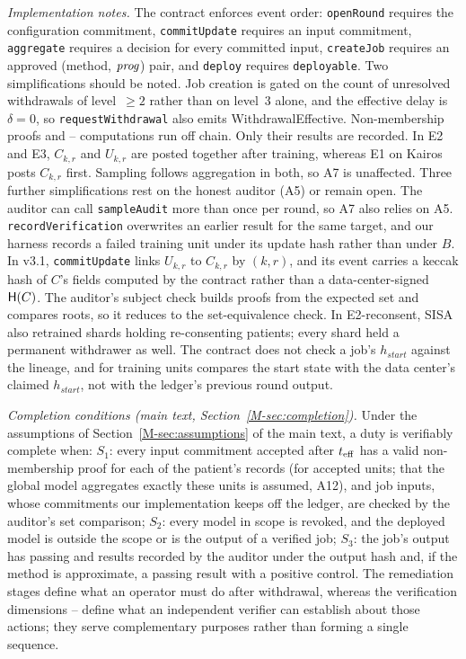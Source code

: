 \emph{Implementation notes.} The contract enforces event order: \texttt{openRound} requires the configuration commitment, \texttt{commitUpdate} requires an input commitment, \texttt{aggregate} requires a decision for every committed input, \texttt{createJob} requires an approved (method, $\mathit{prog}$) pair, and \texttt{deploy} requires \texttt{deployable}. Two simplifications should be noted. Job creation is gated on the count of unresolved withdrawals of level~$\ge2$ rather than on level~3 alone, and the effective delay is $\delta=0$, so \texttt{requestWithdrawal} also emits WithdrawalEffective. Non-membership proofs and \Lone{}--\Lthree{} computations run off chain. Only their results are recorded. In E2 and E3, $C_{k,r}$ and $U_{k,r}$ are posted together after training, whereas E1 on Kairos posts $C_{k,r}$ first. Sampling follows aggregation in both, so A7 is unaffected. Three further simplifications rest on the honest auditor (A5) or remain open. The auditor can call \texttt{sampleAudit} more than once per round, so A7 also relies on A5. \texttt{recordVerification} overwrites an earlier result for the same target, and our harness records a failed training unit under its update hash rather than under $B$. In v3.1, \texttt{commitUpdate} links $U_{k,r}$ to $C_{k,r}$ by $(k,r)$, and its event carries a keccak hash of $C$'s fields computed by the contract rather than a data-center-signed $\mathsf{H}(C)$. The auditor's \Ltwo{} subject check builds proofs from the expected set and compares roots, so it reduces to the set-equivalence check. In E2-reconsent, SISA also retrained shards holding re-consenting patients; every shard held a permanent withdrawer as well. The contract does not check a job's $h_{\mathit{start}}$ against the lineage, and \Lone{} for training units compares the start state with the data center's claimed $h_{\mathit{start}}$, not with the ledger's previous round output.

\emph{Completion conditions (main text, Section~\ref{M-sec:completion}).} Under the assumptions of Section~\ref{M-sec:assumptions} of the main text, a duty is verifiably complete when: $S_1$: every input commitment accepted after $t_{\mathrm{eff}}$ has a valid non-membership proof for each of the patient's records (for accepted units; that the global model aggregates exactly these units is assumed, A12), and job inputs, whose commitments our implementation keeps off the ledger, are checked by the auditor's set comparison; $S_2$: every model in scope is revoked, and the deployed model is outside the scope or is the output of a verified job; $S_3$: the job's output has passing \Lone{} and \Ltwo{} results recorded by the auditor under the output hash and, if the method is approximate, a passing \Lthree{} result with a positive control. The remediation stages define what an operator must do after withdrawal, whereas the verification dimensions \Lone{}--\Lfour{} define what an independent verifier can establish about those actions; they serve complementary purposes rather than forming a single sequence.

